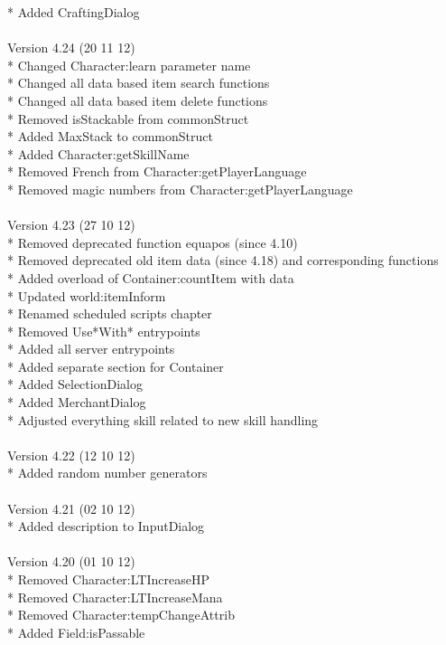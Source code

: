 \documentclass[a4paper,10pt,makeidx]{scrreprt}
\begin{document}
* Added CraftingDialog\\
\\
Version 4.24 (20 11 12)\\
* Changed Character:learn parameter name\\
* Changed all data based item search functions\\
* Changed all data based item delete functions\\
* Removed isStackable from commonStruct\\
* Added MaxStack to commonStruct\\
* Added Character:getSkillName\\
* Removed French from Character:getPlayerLanguage\\
* Removed magic numbers from Character:getPlayerLanguage\\
\\
Version 4.23 (27 10 12)\\
* Removed deprecated function equapos (since 4.10)\\
* Removed deprecated old item data (since 4.18) and corresponding functions\\
* Added overload of Container:countItem with data\\
* Updated world:itemInform\\
* Renamed scheduled scripts chapter\\
* Removed Use*With* entrypoints\\
* Added all server entrypoints\\
* Added separate section for Container\\
* Added SelectionDialog\\
* Added MerchantDialog\\
* Adjusted everything skill related to new skill handling\\
\\
Version 4.22 (12 10 12)\\
* Added random number generators\\
\\
Version 4.21 (02 10 12)\\
* Added description to InputDialog\\
\\
Version 4.20 (01 10 12)\\
* Removed Character:LTIncreaseHP\\
* Removed Character:LTIncreaseMana\\
* Removed Character:tempChangeAttrib\\
* Added Field:isPassable\\
\end{document}
